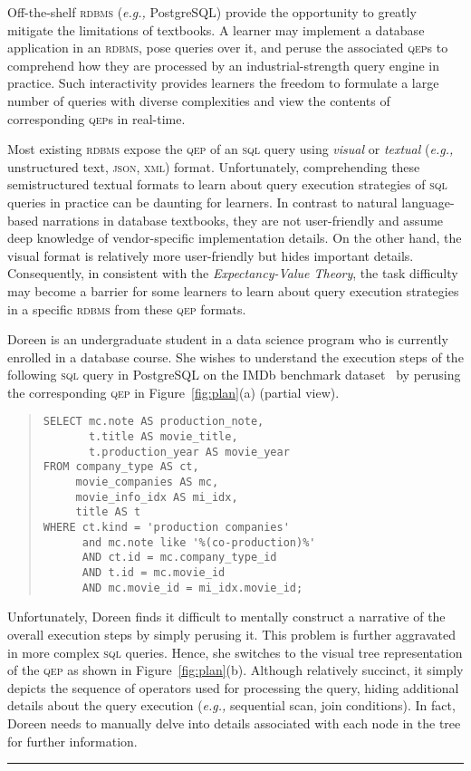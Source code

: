 \documentclass[11pt]{article}
\newcommand{\eg}{\emph{e.g.,}\xspace}
\def\EndOfProof{\nolinebreak\ \hfill\rule{1.5mm}{2.7mm}}
\begin{document}
Off-the-shelf \textsc{rdbms} (\eg PostgreSQL) provide the opportunity to greatly mitigate the limitations of textbooks. A learner may implement a database application in an \textsc{rdbms}, pose queries over it, and peruse the associated \textsc{qep}s to comprehend how they are processed by an industrial-strength query engine in practice. Such interactivity provides learners the freedom to formulate a large number of queries with diverse complexities and view the contents of corresponding \textsc{qep}s in real-time. 

Most existing \textsc{rdbms} expose the \textsc{qep} of an \textsc{sql} query using \textit{visual} or \textit{textual} (\eg unstructured text, \textsc{json}, \textsc{xml}) format.  Unfortunately, comprehending these semistructured textual formats to learn about query execution strategies of \textsc{sql} queries in practice can be daunting for learners. In contrast to natural language-based narrations in database textbooks, they are not user-friendly and assume deep knowledge of vendor-specific implementation details.  On the other hand, the visual format is relatively more user-friendly but hides important details. Consequently, in consistent with the \textit{Expectancy-Value Theory}, the task difficulty may become a barrier for some learners to learn about query execution strategies in a specific \textsc{rdbms} from these \textsc{qep} formats.  

\begin{example} \label{eg:1}
Doreen is an undergraduate student in a data science program who is currently enrolled in a database course. She wishes to understand the execution steps of the following \textsc{sql} query in PostgreSQL on the IMDb benchmark dataset~\cite{imdb} by perusing the corresponding \textsc{qep} in Figure~\ref{fig:plan}(a) (partial view). 
\begin{quote}
\begin{verbatim}
SELECT mc.note AS production_note, 
	   t.title AS movie_title, 
	   t.production_year AS movie_year
FROM company_type AS ct, 
	 movie_companies AS mc, 
	 movie_info_idx AS mi_idx, 
	 title AS t
WHERE ct.kind = 'production companies'
	  and mc.note like '%(co-production)%'
	  AND ct.id = mc.company_type_id
	  AND t.id = mc.movie_id 
      AND mc.movie_id = mi_idx.movie_id;
\end{verbatim}
\end{quote}
 Unfortunately, Doreen finds it difficult to mentally construct a narrative of the overall execution steps by simply perusing it. This problem is further aggravated in more complex \textsc{sql} queries. Hence, she switches to the visual tree representation of the \textsc{qep} as shown in Figure~\ref{fig:plan}(b). Although relatively succinct, it simply depicts the sequence of operators used for processing the query, hiding additional details about the query execution (\eg sequential scan, join conditions).  In fact, Doreen needs to manually delve into details associated with each node in the tree for further information.
\EndOfProof
\end{example}
\end{document}
